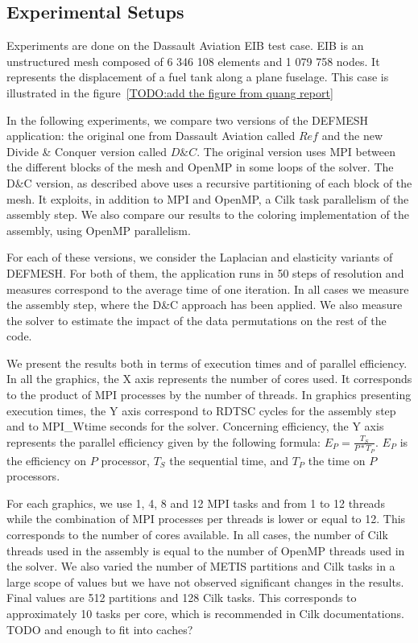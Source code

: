 \documentclass{IOS-Book-Article}
\begin{document}
\subsection{Experimental Setups}
Experiments are done on the Dassault Aviation EIB test case. EIB is an unstructured mesh composed of 6 346 108 elements and 1 079 758 nodes. It represents the displacement of a fuel tank along a plane fuselage. This case is illustrated in the figure~\ref{TODO:add the figure from quang report}

In the following experiments, we compare two versions of the DEFMESH application: the original one from Dassault Aviation called $Ref$ and the new Divide \& Conquer
version called $D\&C$.
The original version uses MPI between the different blocks of the mesh and OpenMP in some loops of the solver.
The D\&C version, as described above uses a recursive partitioning of each block of the mesh. It exploits, in addition to MPI and OpenMP,
a Cilk task parallelism of the assembly step.
We also compare our results to the coloring implementation of the assembly, using OpenMP parallelism.

For each of these versions, we consider the Laplacian and elasticity variants of DEFMESH.
For both of them, the application runs in 50 steps of resolution and measures correspond to the average time of one iteration.
In all cases we measure the assembly step, where the D\&C approach has been applied.
We also measure the solver to estimate the impact of the data permutations on the rest of the code.

We present the results both in terms of execution times and of parallel efficiency.
In all the graphics, the X axis represents the number of cores used. It corresponds to the product of MPI processes by the number of threads.
In graphics presenting execution times, the Y axis correspond to RDTSC cycles for the assembly step and to MPI\_Wtime seconds for the solver.
Concerning efficiency, the Y axis represents the parallel efficiency given by the following formula:
$E_{P} = \frac{T_{S}}{P*T_{P}}$. $E_{P}$ is the efficiency on $P$ processor, $T_{S}$ the sequential time, and $T_{P}$ the time on $P$ processors.

For each graphics, we use 1, 4, 8 and 12 MPI tasks and from 1 to 12 threads while the combination of MPI processes per threads is lower or equal to 12.
This corresponds to the number of cores available. In all cases, the number of Cilk threads used in the assembly is equal to the number of OpenMP threads used in the solver.
We also varied the number of METIS partitions and Cilk tasks in a large scope of values but we have not observed significant changes in the results.
Final values are 512 partitions and 128 Cilk tasks. This corresponds to approximately 10 tasks per core, which is recommended in Cilk documentations. TODO and enough to fit into caches?
\end{document}
